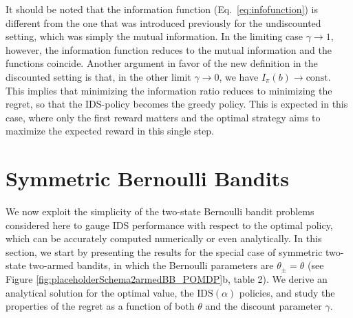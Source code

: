 \documentclass[aps,nofootinbib,groupaddress,superscriptaddress,reprint,amsmath,amssymb,graphicx,onecolumn,prx]{revtex4-2}
\begin{document}
It should be noted that the information function (Eq.~\eqref{eq:infofunction}) is different from the one that was introduced previously \cite{russo2014learning} for the undiscounted setting, which was simply the mutual information. In the limiting case $\gamma\to1$, however, the information function reduces to the mutual information and the functions coincide. Another argument in favor of the new definition in the discounted setting is that, in the other limit $\gamma\to0$, we have $I_\pi(b)\to \mathrm{const}$. This implies that minimizing the information ratio reduces to minimizing the regret, so that the IDS-policy becomes the greedy policy. This is expected in this case, where only the first reward matters and the optimal strategy aims to maximize the expected reward in this single step.


\section{Symmetric Bernoulli Bandits}
\noindent We now exploit the simplicity of the two-state Bernoulli bandit problems considered here to gauge IDS performance with respect to the optimal policy, which can be accurately computed numerically or even analytically. In this section, we start by presenting the results for the special case of symmetric two-state two-armed bandits, in which the Bernoulli parameters are $\theta_\pm = \theta$ (see Figure \ref{fig:placeholderSchema2armedBB_POMDP}b, table 2). We derive an analytical solution for the optimal value, the $\mathrm{IDS}(\alpha)$ policies, and study the properties of the regret as a function of both $\theta$ and the discount parameter $\gamma$.

 
\end{document}
